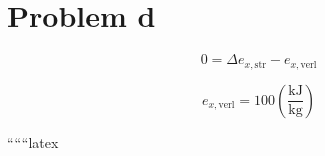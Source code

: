 \section*{Problem d}

\[
0 = \Delta e_{x, \text{str}} - e_{x, \text{verl}}
\]

\[
e_{x, \text{verl}} = 100 \left( \frac{\text{kJ}}{\text{kg}} \right)
\]

``````latex